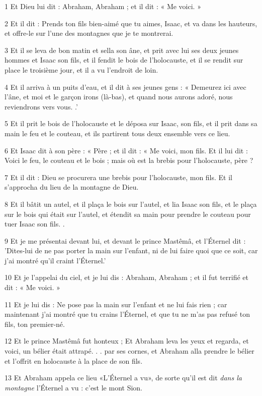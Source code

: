 \par 1 Et Dieu lui dit : Abraham, Abraham ; et il dit : « Me voici. »
\par 2 Et il dit : Prends ton fils bien-aimé que tu aimes, Isaac, et va dans les hauteurs, et offre-le sur l'une des montagnes que je te montrerai.
\par 3 Et il se leva de bon matin et sella son âne, et prit avec lui ses deux jeunes hommes et Isaac son fils, et il fendit le bois de l'holocauste, et il se rendit sur place le troisième jour, et il a vu l'endroit de loin.
\par 4 Et il arriva à un puits d'eau, et il dit à ses jeunes gens : « Demeurez ici avec l'âne, et moi et le garçon irons (là-bas), et quand nous aurons adoré, nous reviendrons vers vous. .'
\par 5 Et il prit le bois de l'holocauste et le déposa sur Isaac, son fils, et il prit dans sa main le feu et le couteau, et ils partirent tous deux ensemble vers ce lieu.
\par 6 Et Isaac dit à son père : « Père ; et il dit : « Me voici, mon fils. Et il lui dit : Voici le feu, le couteau et le bois ; mais où est la brebis pour l'holocauste, père ?
\par 7 Et il dit : Dieu se procurera une brebis pour l'holocauste, mon fils. Et il s'approcha du lieu de la montagne de Dieu.
\par 8 Et il bâtit un autel, et il plaça le bois sur l'autel, et lia Isaac son fils, et le plaça sur le bois qui était sur l'autel, et étendit sa main pour prendre le couteau pour tuer Isaac son fils. .
\par 9 Et je me présentai devant lui, et devant le prince Mastêmâ, et l'Éternel dit : 'Dites-lui de ne pas porter la main sur l'enfant, ni de lui faire quoi que ce soit, car j'ai montré qu'il craint l'Éternel.'
\par 10 Et je l'appelai du ciel, et je lui dis : Abraham, Abraham ; et il fut terrifié et dit : « Me voici. »
\par 11 Et je lui dis : Ne pose pas la main sur l'enfant et ne lui fais rien ; car maintenant j'ai montré que tu crains l'Éternel, et que tu ne m'as pas refusé ton fils, ton premier-né.
\par 12 Et le prince Mastêmâ fut honteux ; Et Abraham leva les yeux et regarda, et voici, un bélier était attrapé. . . par ses cornes, et Abraham alla prendre le bélier et l'offrit en holocauste à la place de son fils.
\par 13 Et Abraham appela ce lieu «L'Éternel a vu», de sorte qu'il est dit \textit{dans la montagne} l'Éternel a vu : c'est le mont Sion.

